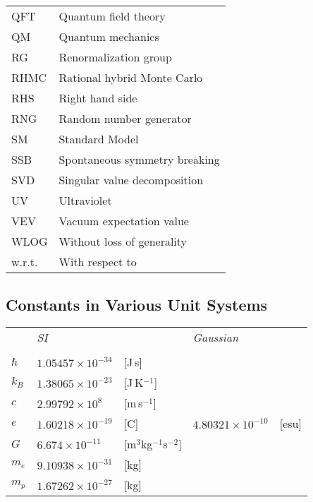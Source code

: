 \documentclass[12pt]{book}
\theoremstyle{definition}
\newenvironment{frontstuff}
  {\centering\chapter*{}}
  {\clearpage}
\begin{document}
\begin{frontstuff}
\begin{tabular}{ll}
QFT     &       Quantum field theory \\
QM      &       Quantum mechanics \\
RG      &       Renormalization group \\
RHMC    &       Rational hybrid Monte Carlo \\
RHS     &       Right hand side \\
RNG     &       Random number generator \\
SM      &       Standard Model \\
SSB     &       Spontaneous symmetry breaking\\
SVD     &       Singular value decomposition\\
UV      &       Ultraviolet \\
VEV     &       Vacuum expectation value\\ 
WLOG    &       Without loss of generality\\
w.r.t.  &       With respect to\\
\end{tabular}
\clearpage


\section*{Constants in Various Unit Systems}
\begin{tabularx}{\linewidth}{LlLll}
 & {\it SI} && {\it Gaussian}&\\ 
\vspace{2mm}\\
$\hbar$  & $1.05457\times 10^{-34}$ & [J\,s]
         & & \\
$k_B$    & $1.38065\times 10^{-23}$ & [J\,K$^{-1}$]
         & & \\
$c$      & $2.99792\times 10^8$ & [m\,s$^{-1}$]
         & & \\
$e$      & $1.60218\times 10^{-19}$ & [C] 
         & $4.80321\times 10^{-10}$ & [esu]\\
$G$      & $6.674\times 10^{-11}$ & [m$^3$kg$^{-1}$s$^{-2}$]
         & & \\
$m_e$    & $9.10938\times 10^{-31}$ & [kg]
         & & \\
$m_p$    & $1.67262\times 10^{-27}$ & [kg]
         & & \\
\end{tabularx}
\clearpage


\end{frontstuff} %
\end{document}
